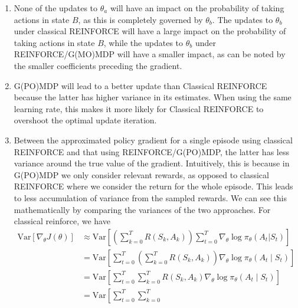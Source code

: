 \documentclass{article}
\begin{document}
\begin{enumerate}
\begin{enumerate}
	      \end{enumerate}
	\item None of the updates to $\theta_a$ will have an impact on the probability of taking actions
	      in state $B$, as this is completely governed by $\theta_b$. The updates to $\theta_b$ under
	      classical REINFORCE will have a large impact on the probability of taking actions in state
	      $B$, while the updates to $\theta_b$ under REINFORCE/G(MO)MDP will have a smaller impact, as
	      can be noted by the smaller coefficients preceding the gradient.
	\item G(PO)MDP will lead to a better update than Classical REINFORCE because the latter has higher
	      variance in its estimates. When using the same learning rate, this makes it more likely for
	      Classical REINFORCE to overshoot the optimal update iteration.
	\item Between the approximated policy gradient for a single episode using classical REINFORCE and
	      that using REINFORCE/G(PO)MDP, the latter has less variance around the true value of the
	      gradient. Intuitively, this is because in G(PO)MDP we only consider relevant rewards, as
	      opposed to classical REINFORCE where we consider the return for the whole episode. This
	      leads to less accumulation of variance from the sampled rewards. We can see this
	      mathematically by comparing the variances of the two approaches. For classical reinforce, we
	      have
	      \begin{align*}
		      \text{Var} \left[\nabla_\theta J(\theta) \right] & \approx \text{Var} \left[ \left(
			      \sum_{k=0}^T R(S_k, A_k) \right) \sum_{t=0}^T \nabla_\theta \log \pi_\theta(A_t | S_t)
		      \right]                                                                                             \\
		                                                       & = \text{Var}\left[\sum_{t=0}^T\left(\sum_{k=0}^T
			      R\left(S_k,A_k\right)\right)\nabla_\theta \log \pi_\theta\left(A_t \mid
		      S_t\right)\right]                                                                                   \\
		                                                       & = \text{Var}\left[\sum_{t=0}^T\sum_{k=0}^T
		      R\left(S_k, A_k\right) \nabla_\theta \log \pi_\theta\left(A_t \mid S_t\right)\right]                \\
		                                                       & = \text{Var}\left[\sum_{t=0}^T\sum_{k=0}^T

\end{align*}
\end{enumerate}
\end{document}
